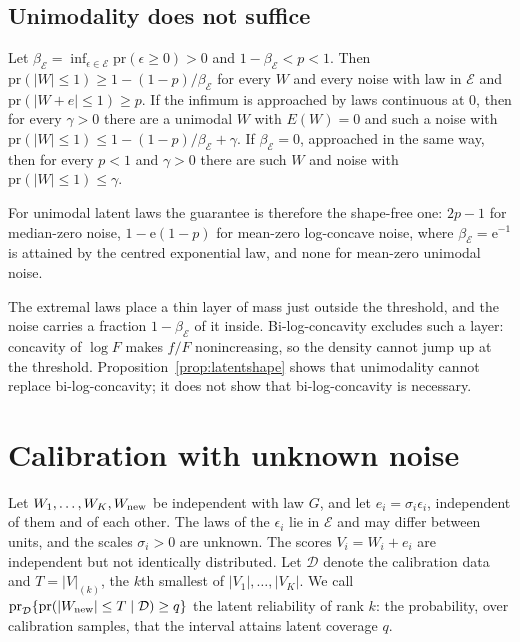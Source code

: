 \documentclass[lineno]{biometrika}
\newcommand{\pr}{\mathrm{pr}}
\begin{document}
\subsection{Unimodality does not suffice}

\begin{proposition}\label{prop:latentshape}
Let $\beta_{\mathcal E} = \inf_{\epsilon \in \mathcal E} \pr(\epsilon \ge 0) > 0$ and $1 - \beta_{\mathcal E} < p < 1$. Then $\pr(|W| \le 1) \ge 1 - (1 - p)/\beta_{\mathcal E}$ for every $W$ and every noise with law in $\mathcal E$ and $\pr(|W + e| \le 1) \ge p$. If the infimum is approached by laws continuous at $0$, then for every $\gamma > 0$ there are a unimodal $W$ with $E(W) = 0$ and such a noise with $\pr(|W| \le 1) \le 1 - (1 - p)/\beta_{\mathcal E} + \gamma$. If $\beta_{\mathcal E} = 0$, approached in the same way, then for every $p < 1$ and $\gamma > 0$ there are such $W$ and noise with $\pr(|W| \le 1) \le \gamma$.
\end{proposition}

For unimodal latent laws the guarantee is therefore the shape-free one: $2p - 1$ for median-zero noise, $1 - \mathrm{e}(1 - p)$ for mean-zero log-concave noise, where $\beta_{\mathcal E} = \mathrm{e}^{-1}$ is attained by the centred exponential law, and none for mean-zero unimodal noise.

The extremal laws place a thin layer of mass just outside the threshold, and the noise carries a fraction $1 - \beta_{\mathcal E}$ of it inside. Bi-log-concavity excludes such a layer: concavity of $\log F$ makes $f/F$ nonincreasing, so the density cannot jump up at the threshold. Proposition~\ref{prop:latentshape} shows that unimodality cannot replace bi-log-concavity; it does not show that bi-log-concavity is necessary.


\section{Calibration with unknown noise}\label{sec:procedure}

Let $W_1, \ldots, W_K, W_{\rm new}$ be independent with law $G$, and let $e_i = \sigma_i\epsilon_i$, independent of them and of each other. The laws of the $\epsilon_i$ lie in $\mathcal E$ and may differ between units, and the scales $\sigma_i > 0$ are unknown. The scores $V_i = W_i + e_i$ are independent but not identically distributed. Let $\mathcal D$ denote the calibration data and $T = |V|_{(k)}$, the $k$th smallest of $|V_1|, \ldots, |V_K|$. We call $\pr_{\mathcal D}\{\pr(|W_{\rm new}| \le T \mid \mathcal D) \ge q\}$ the latent reliability of rank $k$: the probability, over calibration samples, that the interval attains latent coverage $q$.
\end{document}
